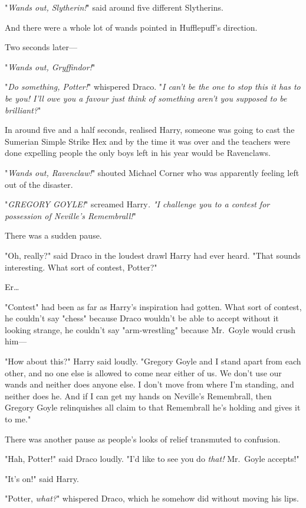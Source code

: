 "\emph{Wands out, Slytherin!}" said around five different Slytherins.

And there were a whole lot of wands pointed in Hufflepuff's direction.

Two seconds later---

"\emph{Wands out, Gryffindor!}"

"\emph{Do something, Potter!}" whispered Draco. "\emph{I can't be the one to 
stop this it has to be you! I'll owe you a favour just think of something 
aren't you supposed to be brilliant?}"

In around five and a half seconds, realised Harry, someone was going to cast 
the Sumerian Simple Strike Hex and by the time it was over and the teachers 
were done expelling people the only boys left in his year would be Ravenclaws.

"\emph{Wands out, Ravenclaw!}" shouted Michael Corner who was apparently 
feeling left out of the disaster.

"\emph{GREGORY GOYLE!}" screamed Harry\emph{. "I challenge you to a contest for 
possession of Neville's Remembrall!}"

There was a sudden pause.

"Oh, really?" said Draco in the loudest drawl Harry had ever heard. "That 
sounds interesting. What sort of contest, Potter?"

Er{\ldots}

"Contest" had been as far as Harry's inspiration had gotten. What sort of 
contest, he couldn't say "chess" because Draco wouldn't be able to accept 
without it looking strange, he couldn't say "arm-wrestling" because Mr.~Goyle 
would crush him---

"How about this?" Harry said loudly. "Gregory Goyle and I stand apart from each 
other, and no one else is allowed to come near either of us. We don't use our 
wands and neither does anyone else. I don't move from where I'm standing, and 
neither does he. And if I can get my hands on Neville's Remembrall, then 
Gregory Goyle relinquishes all claim to that Remembrall he's holding and gives 
it to me."

There was another pause as people's looks of relief transmuted to confusion.

"Hah, Potter!" said Draco loudly. "I'd like to see you do \emph{that!} 
Mr.~Goyle accepts!"

"It's on!" said Harry.

"Potter, \emph{what?}" whispered Draco, which he somehow did without moving his 
lips.

